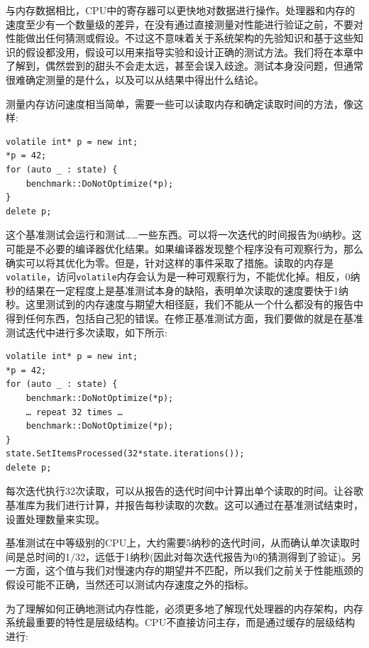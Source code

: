 
与内存数据相比，CPU中的寄存器可以更快地对数据进行操作。处理器和内存的速度至少有一个数量级的差异，在没有通过直接测量对性能进行验证之前，不要对性能做出任何猜测或假设。不过这不意味着关于系统架构的先验知识和基于这些知识的假设都没用，假设可以用来指导实验和设计正确的测试方法。我们将在本章中了解到，偶然尝到的甜头不会走太远，甚至会误入歧途。测试本身没问题，但通常很难确定测量的是什么，以及可以从结果中得出什么结论。

测量内存访问速度相当简单，需要一些可以读取内存和确定读取时间的方法，像这样:

\begin{lstlisting}[style=styleCXX]
volatile int* p = new int;
*p = 42;
for (auto _ : state) {
	benchmark::DoNotOptimize(*p);
}
delete p;
\end{lstlisting}

这个基准测试会运行和测试……一些东西。可以将一次迭代的时间报告为0纳秒。这可能是不必要的编译器优化结果。如果编译器发现整个程序没有可观察行为，那么确实可以将其优化为零。但是，针对这样的事件采取了措施。读取的内存是\texttt{volatile}，访问\texttt{volatile}内存会认为是一种可观察行为，不能优化掉。相反，0纳秒的结果在一定程度上是基准测试本身的缺陷，表明单次读取的速度要快于1纳秒。这里测试到的内存速度与期望大相径庭，我们不能从一个什么都没有的报告中得到任何东西，包括自己犯的错误。在修正基准测试方面，我们要做的就是在基准测试迭代中进行多次读取，如下所示:

\begin{lstlisting}[style=styleCXX]
volatile int* p = new int;
*p = 42;
for (auto _ : state) {
	benchmark::DoNotOptimize(*p);
	… repeat 32 times …
	benchmark::DoNotOptimize(*p);
}
state.SetItemsProcessed(32*state.iterations());
delete p;
\end{lstlisting}

每次迭代执行32次读取，可以从报告的迭代时间中计算出单个读取的时间。让谷歌基准库为我们进行计算，并报告每秒读取的次数。这可以通过在基准测试结束时，设置处理数量来实现。

基准测试在中等级别的CPU上，大约需要5纳秒的迭代时间，从而确认单次读取时间是总时间的1/32，远低于1纳秒(因此对每次迭代报告为0的猜测得到了验证)。另一方面，这个值与我们对慢速内存的期望并不匹配，所以我们之前关于性能瓶颈的假设可能不正确，当然还可以测试内存速度之外的指标。


为了理解如何正确地测试内存性能，必须更多地了解现代处理器的内存架构，内存系统最重要的特性是层级结构。CPU不直接访问主存，而是通过缓存的层级结构进行:

